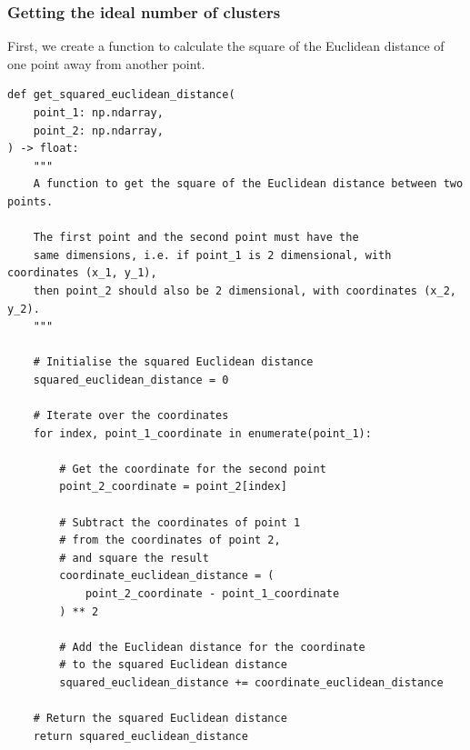 \documentclass[11pt]{article}
\begin{document}
\subsubsection{Getting the ideal number of clusters}
\label{sec:orgea99fce}
First, we create a function to calculate the square of the Euclidean distance of one point away from another point.
\begin{verbatim}
def get_squared_euclidean_distance(
    point_1: np.ndarray,
    point_2: np.ndarray,
) -> float:
    """
    A function to get the square of the Euclidean distance between two points.

    The first point and the second point must have the
    same dimensions, i.e. if point_1 is 2 dimensional, with coordinates (x_1, y_1),
    then point_2 should also be 2 dimensional, with coordinates (x_2, y_2).
    """

    # Initialise the squared Euclidean distance
    squared_euclidean_distance = 0

    # Iterate over the coordinates
    for index, point_1_coordinate in enumerate(point_1):

        # Get the coordinate for the second point
        point_2_coordinate = point_2[index]

        # Subtract the coordinates of point 1
        # from the coordinates of point 2,
        # and square the result
        coordinate_euclidean_distance = (
            point_2_coordinate - point_1_coordinate
        ) ** 2

        # Add the Euclidean distance for the coordinate
        # to the squared Euclidean distance
        squared_euclidean_distance += coordinate_euclidean_distance

    # Return the squared Euclidean distance
    return squared_euclidean_distance
\end{verbatim}

 \newpage
\end{document}
